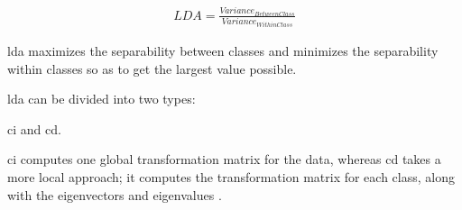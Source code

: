 \begin{align}
  LDA = \frac{Variance_{BetweenClass}}{Variance_{WithinClass}}
\end{align}


\gls{lda} maximizes the separability between classes and minimizes the separability within classes so as to get the largest value possible.


\gls{lda} can be divided into two types:

\gls{ci} and \gls{cd}.

\gls{ci} computes one global transformation matrix for the data, whereas \gls{cd} takes a more local approach; it computes the transformation matrix for each class, along with the eigenvectors and eigenvalues \cite{linear-discriminant-analysis-tutorial}.


